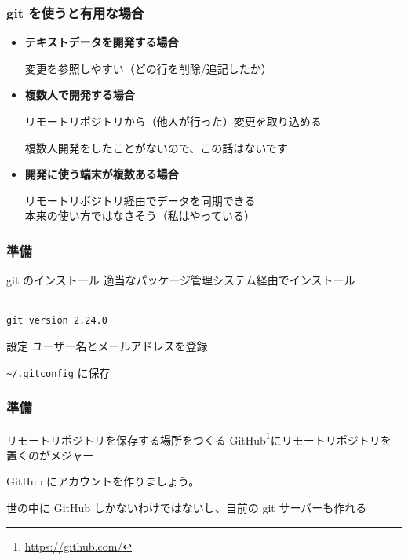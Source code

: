 \begin{frame}
	\frametitle{git を使うと有用な場合}
	\begin{itemize}
		\item \textbf{テキストデータを開発する場合}

			{\small 変更を参照しやすい（どの行を削除/追記したか）}
		\item \textbf{複数人で開発する場合}

			{\small リモートリポジトリから（他人が行った）変更を取り込める}

			{\small 複数人開発をしたことがないので、この話はないです}
		\item \textbf{開発に使う端末が複数ある場合}

			{\small リモートリポジトリ経由でデータを同期できる}\\
			{\small 本来の使い方ではなさそう（私はやっている）}
	\end{itemize}
\end{frame}

\begin{frame}
	\frametitle{準備}
	\begin{block}{git のインストール}
		適当なパッケージ管理システム経由でインストール


		\\
		\texttt{git version 2.24.0}
	\end{block}
	\begin{block}{設定}
		ユーザー名とメールアドレスを登録


		\texttt{\~{}/.gitconfig} に保存
	\end{block}
\end{frame}

\begin{frame}
	\frametitle{準備}
	\begin{block}{リモートリポジトリを保存する場所をつくる}
		GitHub\footnote{\url{https://github.com/}}にリモートリポジトリを置くのがメジャー

		GitHub にアカウントを作りましょう。

		世の中に GitHub しかないわけではないし、自前の git サーバーも作れる
	\end{block}
\end{frame}

